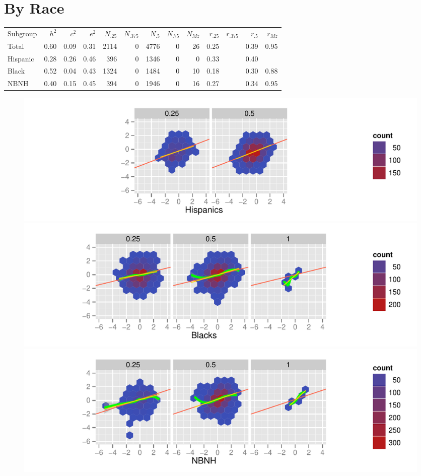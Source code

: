 \documentclass[a4paper]{article}
\begin{document}
\newpage
\section{By Race}
\begin{table}[ht]
\begin{center}
\begin{tabular}{l|rrr|rrrrr|rrrr}
 Subgroup & $h^2$ & $c^2$ & $e^2$ & $N_{.25}$ & $N_{.375}$ & $N_{.5}$ & $N_{.75}$ & $N_{Mz}$ & $r_{.25}$ & $r_{.375}$ & $r_{.5}$ & $r_{Mz}$ \\ 
 Total & 0.60 & 0.09 & 0.31 & 2114 &   0 & 4776 &   0 &  26 & 0.25 &  & 0.39 & 0.95 \\ 
   \hline
Hispanic & 0.28 & 0.26 & 0.46 & 396 &   0 & 1346 &   0 &   0 & 0.33 &  & 0.40 &  \\ 
  Black & 0.52 & 0.04 & 0.43 & 1324 &   0 & 1484 &   0 &  10 & 0.18 &  & 0.30 & 0.88 \\ 
  NBNH & 0.40 & 0.15 & 0.45 & 394 &   0 & 1946 &   0 &  16 & 0.27 &  & 0.34 & 0.95 \\ 
  \end{tabular}
\end{center}
\end{table}\begin{figure}[htbp]
\includegraphics{Height-010}
\includegraphics{Height-011}
\includegraphics{Height-012}
\end{figure}
\end{document}
